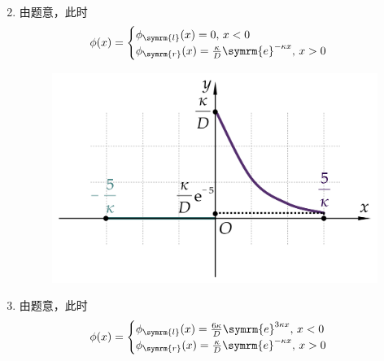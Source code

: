 \begin{exercise}
\begin{solution}
\begin{enumerate}[(1)]
\begin{align*}
            \end{align*}
            \item 由题意，此时
            \begin{equation*}
                \phi(x) = \begin{cases}
                    \phi_{\symrm{l}}(x) = 0,\,x < 0 \\
                    \phi_{\symrm{r}}(x) = \frac{\kappa}{D} \symrm{e}^{-\kappa x},\,x > 0
                \end{cases}
            \end{equation*}
            \begin{figure}[H]
                \centering
                \includegraphics[scale=1]{figures/fig4.9-2.png}
            \end{figure}
            \item 由题意，此时
            \begin{equation*}
                \phi(x) = \begin{cases}
                    \phi_{\symrm{l}}(x) = \frac{6\kappa}{D} \symrm{e}^{3\kappa x},\,x < 0 \\
                    \phi_{\symrm{r}}(x) = \frac{\kappa}{D} \symrm{e}^{-\kappa x},\,x > 0
                \end{cases}
            \end{equation*}
            \begin{figure}[H]
                \centering

\end{figure}
\end{enumerate}
\end{solution}
\end{exercise}
